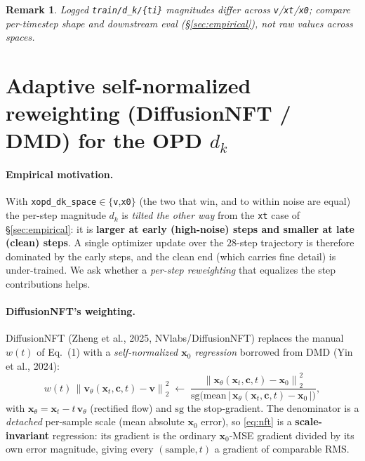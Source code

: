 \documentclass[11pt,a4paper]{article}
\newcommand{\norm}[1]{\left\lVert #1 \right\rVert}
\newcommand{\dk}{d_k}
\newtheorem*{remark*}{Remark}
\begin{document}
\begin{remark*}
Logged \verb|train/d_k/{ti}| magnitudes differ across \texttt{v}/\texttt{xt}/\texttt{x0}; compare
per-timestep \emph{shape} and downstream eval (\S\ref{sec:empirical}), not raw values across spaces.
\end{remark*}

\section[Adaptive self-normalized reweighting for OPD dk]
{Adaptive self-normalized reweighting (DiffusionNFT / DMD) for the OPD $d_k$}
\label{sec:selfnorm}

\paragraph{Empirical motivation.} With \texttt{xopd\_dk\_space}$\in\{$\texttt{v},\texttt{x0}$\}$ (the two
that win, and to within noise are equal) the per-step magnitude $\dk$ is \emph{tilted the other way}
from the \texttt{xt} case of \S\ref{sec:empirical}: it is \textbf{larger at early (high-noise) steps and
smaller at late (clean) steps}. A single optimizer update over the $28$-step trajectory is therefore
dominated by the early steps, and the clean end (which carries fine detail) is under-trained. We ask
whether a \emph{per-step reweighting} that equalizes the step contributions helps.

\paragraph{DiffusionNFT's weighting.} DiffusionNFT (Zheng et al., 2025, NVlabs/DiffusionNFT) replaces
the manual $w(t)$ of Eq.~(1) with a \emph{self-normalized $\bm{x}_0$ regression} borrowed from DMD
(Yin et al., 2024):
\begin{equation}\label{eq:nft}
  w(t)\,\norm{\bm{v}_\theta(\bm{x}_t,\bm{c},t)-\bm{v}}_2^2
  \;\longleftarrow\;
  \frac{\norm{\bm{x}_\theta(\bm{x}_t,\bm{c},t)-\bm{x}_0}_2^2}
       {\mathrm{sg}\!\big(\mathrm{mean}\,|\,\bm{x}_\theta(\bm{x}_t,\bm{c},t)-\bm{x}_0\,|\big)},
\end{equation}
with $\bm{x}_\theta=\bm{x}_t-t\,\bm{v}_\theta$ (rectified flow) and $\mathrm{sg}$ the stop-gradient. The
denominator is a \emph{detached} per-sample scale (mean absolute $\bm{x}_0$ error), so \eqref{eq:nft} is
a \textbf{scale-invariant} regression: its gradient is the ordinary $\bm{x}_0$-MSE gradient divided by
its own error magnitude, giving every $(\text{sample},t)$ a gradient of comparable RMS.
\end{document}
